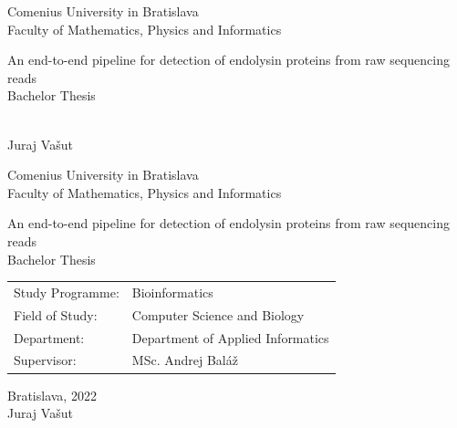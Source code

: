 \documentclass[12pt, twoside]{book}
\def\mfrok{2022}
\def\mfnazov{An end-to-end pipeline for detection of endolysin proteins from raw sequencing reads}
\def\mftyp{Bachelor Thesis}
\def\mfautor{Juraj Vašut}
\def\mfskolitel{MSc. Andrej Baláž}
\def\mfkonzultant{tit. Meno Priezvisko, tit. }
\def\mfmiesto{Bratislava, \mfrok}
\def\mfodbor{Computer Science and Biology}
\def\program{ Bioinformatics }
\def\mfpracovisko{ Department of Applied Informatics }
\begin{document}
     
\frontmatter


\thispagestyle{empty}

\begin{center}
  \sc\large
  Comenius University in Bratislava\\
  Faculty of Mathematics, Physics and Informatics

\vfill

{\LARGE\mfnazov}\\
\mftyp
\end{center}

\vfill

{\sc\large 
\noindent \mfrok\\
\mfautor
}

\cleardoublepage


\thispagestyle{empty}
\noindent

\begin{center}
\sc  
\large
  Comenius University in Bratislava\\
  Faculty of Mathematics, Physics and Informatics

\vfill

{\LARGE\mfnazov}\\
\mftyp
\end{center}

\vfill

\noindent
\begin{tabular}{ll}
Study Programme: & \program \\
Field of Study: & \mfodbor \\
Department: & \mfpracovisko \\
Supervisor: & \mfskolitel \\
\end{tabular}

\vfill


\noindent \mfmiesto\\
\mfautor

\cleardoublepage


\end{document}

